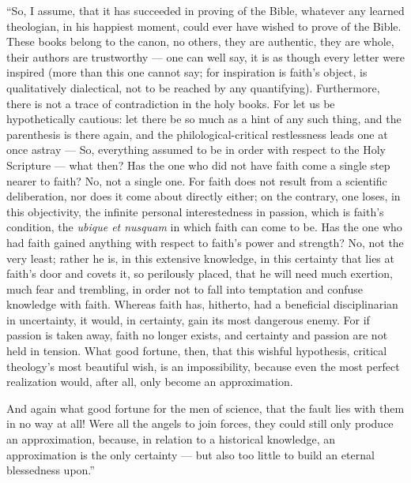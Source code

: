 \documentclass[12pt]{book}
\begin{document}
``So, I assume, that it has succeeded in proving of the Bible, whatever any learned theologian, in his happiest moment, could ever have wished to prove of the Bible. These books belong to the canon, no others, they are authentic, they are whole, their authors are trustworthy --- one can well say, it is as though every letter were inspired (more than this one cannot say; for inspiration is faith's object,
is qualitatively dialectical, not to be reached by any quantifying). Furthermore, there is not a trace of contradiction in the holy books. For let us be hypothetically cautious: let there be so much as a hint of any such thing, and the parenthesis is there again, and the philological-critical restlessness leads one at once astray --- So, everything assumed to be in order with respect to the Holy Scripture --- what then? Has the one who did not have faith come a single step nearer to faith? No, not a single one. For faith does not result from a scientific deliberation, nor does it come about directly either; on the contrary, one loses, in this objectivity, the infinite personal interestedness in passion, which is faith's condition, the \textit{ubique et nusquam} in which faith can come to be. Has the one who had faith gained anything with respect to faith's power and strength? No, not the very least; rather he is, in this extensive knowledge, in this certainty that lies at faith's door and covets it, so perilously placed, that he will need much exertion, much fear and trembling, in order not to fall into temptation and confuse knowledge with faith. Whereas faith has, hitherto, had a beneficial disciplinarian in uncertainty, it would, in certainty, gain its most dangerous enemy. For if passion is taken away, faith no longer exists, and certainty and passion are not held in tension. What good fortune, then, that this wishful hypothesis, critical theology's most beautiful wish, is an impossibility, because even the most perfect realization would, after all, only become an approximation.

And again what good fortune for the men of science, that the fault lies with them in no way at all! Were all the angels to join forces, they could still only produce an approximation, because, in relation to a historical knowledge, an approximation is the only certainty --- but also too little to build an eternal blessedness upon.''
\end{document}
